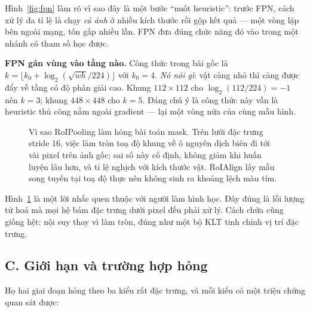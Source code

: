 \documentclass[../../../deep_learning.tex]{subfiles}
\begin{document}
\begin{itemize}
Hình~\ref{fig:fpn} làm rõ vì sao đây là một bước ``nuốt heuristic'': trước FPN, cách xử lý đa tỉ lệ là chạy \emph{cả ảnh} ở nhiều kích thước rồi gộp kết quả --- một vòng lặp bên ngoài mạng, tốn gấp nhiều lần. FPN đưa đúng chức năng đó vào trong một nhánh có tham số học được.

\textbf{FPN gán vùng vào tầng nào.} Công thức trong bài gốc là \(k=\lfloor k_0 + \log_2(\sqrt{wh}/224)\rfloor\) với \(k_0=4\). \emph{Nó nói gì}: vật càng nhỏ thì càng được đẩy về tầng có độ phân giải cao. Khung \(112\times112\) cho \(\log_2(112/224) = -1\) nên \(k=3\); khung \(448\times448\) cho \(k=5\). Đáng chú ý là công thức này vẫn là heuristic thủ công nằm ngoài gradient --- lại một vòng nữa của cùng mẫu hình.
\end{itemize}

\begin{figure}[H]\centering
{}
\caption{Vì sao RoIPooling làm hỏng bài toán mask. Trên lưới đặc trưng stride 16, việc làm tròn toạ độ khung về ô nguyên dịch biên đi tới vài pixel trên ảnh gốc; sai số này cố định, không giảm khi huấn luyện lâu hơn, và tỉ lệ nghịch với kích thước vật. RoIAlign lấy mẫu song tuyến tại toạ độ thực nên không sinh ra khoảng lệch màu tím.}
\label{fig:roialign}
\end{figure}

Hình~\ref{fig:roialign} là một lời nhắc quen thuộc với người làm hình học. Đây đúng là lỗi lượng tử hoá mà mọi hệ bám đặc trưng dưới pixel đều phải xử lý. Cách chữa cũng giống hệt: nội suy thay vì làm tròn, đúng như một bộ  KLT tinh chỉnh vị trí đặc trưng.

\subsection{C. Giới hạn và trường hợp hỏng}
Họ hai giai đoạn hỏng theo ba kiểu rất đặc trưng, và mỗi kiểu có một triệu chứng quan sát được:
\end{document}
